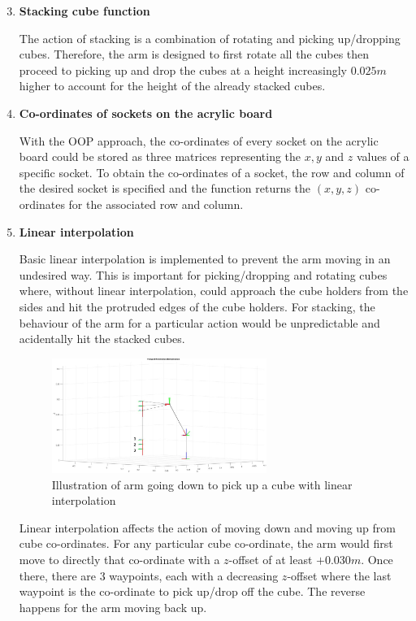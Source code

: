 \documentclass[9pt, a4paper]{article}
\begin{document}
\begin{enumerate}
  \setcounter{enumi}{2}
  \item \textbf{Stacking cube function}
  
  The action of stacking is a combination of rotating and picking
  up/dropping cubes. Therefore, the arm is designed to first rotate all the cubes
  then proceed to picking up and drop the cubes at a height increasingly $0.025m$ higher to
  account for the height of the already stacked cubes. 
  
  \item \textbf{Co-ordinates of sockets on the acrylic board}
  
  With the OOP approach, the co-ordinates of every socket on the
  acrylic board could be stored as three matrices representing the $x, y$ and $z$
  values of a specific socket. To obtain the co-ordinates of a socket, the row and
  column of the desired socket is specified and the function returns the $(x,y,z)$
  co-ordinates for the associated row and column.  

  \item \textbf{Linear interpolation}
  
  Basic linear interpolation is implemented to prevent the arm moving in an
  undesired way. This is important for picking/dropping and rotating cubes where,
  without linear interpolation, could approach the cube holders from the sides
  and hit the protruded edges of the cube holders. For stacking, the behaviour
  of the arm for a particular action would be unpredictable and acidentally hit
  the stacked cubes. 

  \begin{figure}[h]
      \centering
      \includegraphics[width=7cm]{Linear}
      \caption{Illustration of arm going down to pick up a cube with linear interpolation}
  \end{figure}

  Linear interpolation affects the action of moving down and moving up
  from cube co-ordinates. For any particular cube co-ordinate, the arm would first move to directly
  that co-ordinate with a $z$-offset of at least $+0.030m$. Once there, there
  are 3 waypoints, each with a decreasing $z$-offset where the last waypoint is
  the co-ordinate to pick up/drop off the cube. The reverse happens for the
  arm moving back up.


\end{enumerate}
\end{document}
